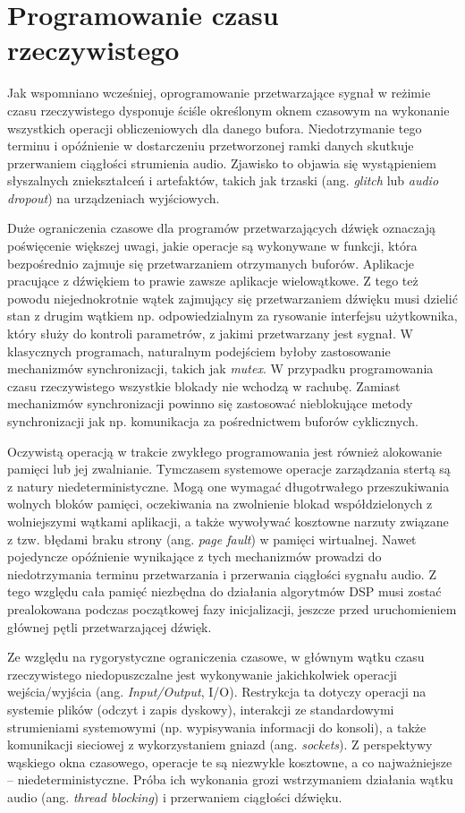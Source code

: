 \documentclass[12pt,a4paper]{report}
\begin{document}
\section{Programowanie czasu rzeczywistego}
Jak wspomniano wcześniej, oprogramowanie przetwarzające sygnał w
reżimie czasu rzeczywistego dysponuje ściśle określonym oknem
czasowym na wykonanie wszystkich operacji obliczeniowych dla danego
bufora. Niedotrzymanie tego terminu i opóźnienie w dostarczeniu
przetworzonej ramki danych skutkuje przerwaniem ciągłości strumienia
audio. Zjawisko to objawia się wystąpieniem słyszalnych zniekształceń
i artefaktów, takich jak trzaski (ang. \textit{glitch} lub
\textit{audio dropout}) na urządzeniach wyjściowych\cite{real_time_101}.

Duże ograniczenia czasowe dla programów przetwarzających dźwięk
oznaczają poświęcenie większej uwagi, jakie operacje są wykonywane w
funkcji, która bezpośrednio zajmuje się przetwarzaniem otrzymanych
buforów. Aplikacje pracujące z dźwiękiem to prawie zawsze aplikacje
wielowątkowe. Z tego też powodu niejednokrotnie wątek zajmujący się
przetwarzaniem dźwięku musi dzielić stan z drugim wątkiem np.
odpowiedzialnym za rysowanie interfejsu użytkownika, który służy do
kontroli parametrów, z jakimi przetwarzany jest sygnał. W klasycznych
programach, naturalnym podejściem byłoby zastosowanie mechanizmów
synchronizacji, takich jak \textit{mutex}. W przypadku programowania
czasu rzeczywistego wszystkie blokady nie wchodzą w rachubę. Zamiast
mechanizmów synchronizacji powinno się zastosować nieblokujące metody
synchronizacji jak np. komunikacja za pośrednictwem buforów cyklicznych.

Oczywistą operacją w trakcie zwykłego programowania jest również
alokowanie pamięci lub jej zwalnianie. Tymczasem systemowe operacje
zarządzania stertą są z natury niedeterministyczne. Mogą one wymagać
długotrwałego przeszukiwania wolnych bloków pamięci, oczekiwania na
zwolnienie blokad współdzielonych z wolniejszymi wątkami aplikacji, a
także wywoływać kosztowne narzuty związane z tzw. błędami braku
strony (ang. \textit{page fault}) w pamięci wirtualnej. Nawet
pojedyncze opóźnienie wynikające z tych mechanizmów prowadzi do
niedotrzymania terminu przetwarzania i przerwania ciągłości sygnału
audio. Z tego względu cała pamięć niezbędna do działania algorytmów
DSP musi zostać prealokowana podczas początkowej fazy inicjalizacji,
jeszcze przed uruchomieniem głównej pętli przetwarzającej dźwięk.

Ze względu na rygorystyczne ograniczenia czasowe, w głównym wątku
czasu rzeczywistego niedopuszczalne jest wykonywanie jakichkolwiek
operacji wejścia/wyjścia (ang. \textit{Input/Output}, I/O).
Restrykcja ta dotyczy operacji na systemie plików (odczyt i zapis
dyskowy), interakcji ze standardowymi strumieniami systemowymi (np.
wypisywania informacji do konsoli), a także komunikacji sieciowej z
wykorzystaniem gniazd (ang. \textit{sockets}). Z perspektywy wąskiego
okna czasowego, operacje te są niezwykle kosztowne, a co
najważniejsze – niedeterministyczne. Próba ich wykonania
grozi wstrzymaniem działania wątku audio (ang. \textit{thread
blocking}) i przerwaniem ciągłości dźwięku.
\end{document}
